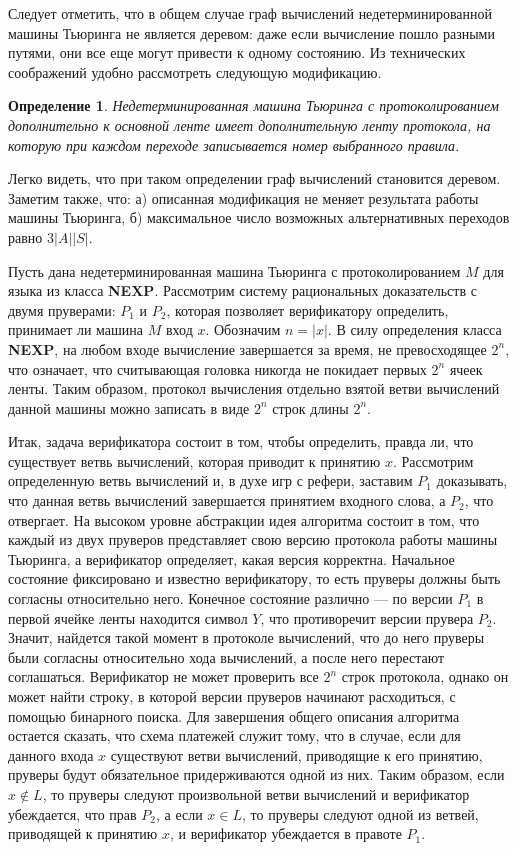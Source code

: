 \documentclass[14pt, a4paper]{extreport}
\newtheorem{definition}{\indent Определение}
\begin{document}
        Следует отметить, что в общем случае граф вычислений недетерминированной машины Тьюринга не является деревом: даже если вычисление пошло разными путями, они все еще могут привести к одному состоянию. Из технических соображений удобно рассмотреть следующую модификацию.

        \begin{definition}
            Недетерминированная машина Тьюринга с протоколированием дополнительно к основной ленте имеет дополнительную ленту протокола, на которую при каждом переходе записывается номер выбранного правила.
        \end{definition}

        Легко видеть, что при таком определении граф вычислений становится деревом. Заметим также, что: а) описанная модификация не меняет результата работы машины Тьюринга, б) максимальное число возможных альтернативных переходов равно $3|A||S|$.

        Пусть дана недетерминированная машина Тьюринга с протоколированием $M$ для языка из класса \textbf{NEXP}. Рассмотрим систему рациональных доказательств с двумя пруверами: $P_1$ и $P_2$, которая позволяет верификатору определить, принимает ли машина $M$ вход $x$. Обозначим $n = |x|$. В силу определения класса \textbf{NEXP}, на любом входе вычисление завершается за время, не превосходящее $2 ^ n$, что означает, что считывающая головка никогда не покидает первых $2^n$ ячеек ленты. Таким образом, протокол вычисления отдельно взятой ветви вычислений данной машины можно записать в виде $2^n$ строк длины $2^n$.

        Итак, задача верификатора состоит в том, чтобы определить, правда ли, что существует ветвь вычислений, которая приводит к принятию $x$. Рассмотрим определенную ветвь вычислений и, в духе игр с рефери, заставим $P_1$ доказывать, что данная ветвь вычислений завершается принятием входного слова, а $P_2$, что отвергает. На высоком уровне абстракции идея алгоритма состоит в том, что каждый из двух пруверов представляет свою версию протокола работы машины Тьюринга, а верификатор определяет, какая версия корректна. Начальное состояние фиксировано и известно верификатору, то есть пруверы должны быть согласны относительно него. Конечное состояние различно --- по версии $P_1$ в первой ячейке ленты находится символ $Y$, что противоречит версии прувера $P_2$. Значит, найдется такой момент в протоколе вычислений, что до него пруверы были согласны относительно хода вычислений, а после него перестают соглашаться.
        Верификатор не может проверить все $2^n$ строк протокола, однако он может найти строку, в которой версии пруверов начинают расходиться, с помощью бинарного поиска. Для завершения общего описания алгоритма остается сказать, что схема платежей служит тому, что в случае, если для данного входа $x$ существуют ветви вычислений, приводящие к его принятию, пруверы будут обязательное придерживаются одной из них. Таким образом, если $x \notin L$, то пруверы следуют произвольной ветви вычислений и верификатор убеждается, что прав $P_2$, а если $x \in L$, то пруверы следуют одной из ветвей, приводящей к принятию $x$, и верификатор убеждается в правоте $P_1$.
\end{document}
